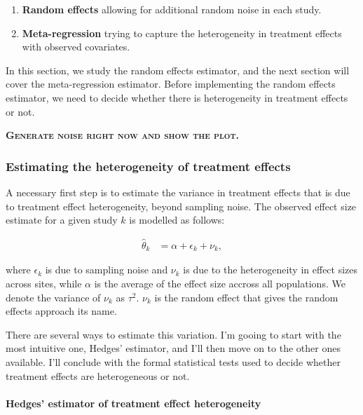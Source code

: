 \documentclass[]{book}
\providecommand{\tightlist}{%
  \setlength{\itemsep}{0pt}\setlength{\parskip}{0pt}}
\let\oldparagraph\paragraph
\renewcommand{\paragraph}[1]{\oldparagraph{#1}\mbox{}}
\theoremstyle{definition}
\theoremstyle{definition}
\theoremstyle{definition}
\theoremstyle{remark}
\begin{document}
\begin{enumerate}
\def\labelenumi{\arabic{enumi}.}
\tightlist
\item
  \textbf{Random effects} allowing for additional random noise in each study.
\item
  \textbf{Meta-regression} trying to capture the heterogeneity in treatment effects with observed covariates.
\end{enumerate}

In this section, we study the random effects estimator, and the next section will cover the meta-regression estimator.
Before implementing the random effects estimator, we need to decide whether there is heterogeneity in treatment effects or not.

\textbf{\textsc{Generate noise right now and show the plot.}}

\hypertarget{estimating-the-heterogeneity-of-treatment-effects}{%
\subsubsection{Estimating the heterogeneity of treatment effects}\label{estimating-the-heterogeneity-of-treatment-effects}}

A necessary first step is to estimate the variance in treatment effects that is due to treatment effect heterogeneity, beyond sampling noise.
The observed effect size estimate for a given study \(k\) is modelled as follows:

\begin{align*}
\hat{\theta}_k & = \alpha + \epsilon_k + \nu_k,
\end{align*}

where \(\epsilon_k\) is due to sampling noise and \(\nu_k\) is due to the heterogeneity in effect sizes across sites, while \(\alpha\) is the average of the effect size accross all populations.
We denote the variance of \(\nu_k\) as \(\tau^2\).
\(\nu_k\) is the random effect that gives the random effects approach its name.

There are several ways to estimate this variation.
I'm gooing to start with the most intuitive one, Hedges' estimator, and I'll then move on to the other ones available.
I'll conclude with the formal statistical tests used to decide whether treatment effects are heterogeneous or not.

\hypertarget{hedges-estimator-of-treatment-effect-heterogeneity}{%
\paragraph{Hedges' estimator of treatment effect heterogeneity}\label{hedges-estimator-of-treatment-effect-heterogeneity}}
\end{document}
